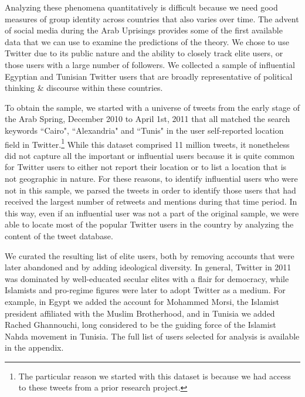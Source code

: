 \documentclass[12pt]{article}
\begin{document}
Analyzing these phenomena quantitatively is difficult because we need good measures of group identity across countries that also varies over time. The advent of social media during the Arab Uprisings provides some of the first available data that we can use to examine the predictions of the theory. We chose to use Twitter due to its public nature and the ability to closely track elite users, or those users with a large number of followers. We collected a sample of influential Egyptian and Tunisian Twitter users that are broadly representative of political thinking \& discourse within these countries.

To obtain the sample, we started with a universe of tweets from the early stage of the Arab Spring, December 2010 to April 1st, 2011 that all matched the search keywords ``Cairo", ``Alexandria" and ``Tunis" in the user self-reported location field in Twitter.\footnote{The particular reason we started with this dataset is because we had access to these tweets from a prior research project.}  While this dataset comprised 11 million tweets, it nonetheless did not capture all the important or influential users because it is quite common for Twitter users to either not report their location or to list a location that is not geographic in nature. For these reasons, to identify influential users who were not in this sample, we parsed the tweets in order to identify those users that had received the largest number of retweets and mentions during that time period. In this way, even if an influential user was not a part of the original sample, we were able to locate most of the popular Twitter users in the country by analyzing the content of the tweet database.

We curated the resulting list of elite users, both by removing accounts that were later abandoned and by adding ideological diversity. In general, Twitter in 2011 was dominated by well-educated secular elites with a flair for democracy, while Islamists and pro-regime figures were later to adopt Twitter as a medium. For example, in Egypt we added the account for Mohammed Morsi, the Islamist president affiliated with the Muslim Brotherhood, and in Tunisia we added Rached Ghannouchi, long considered to be the guiding force of the Islamist Nahda movement in Tunisia. The full list of users selected for analysis is available in the appendix.
\end{document}
